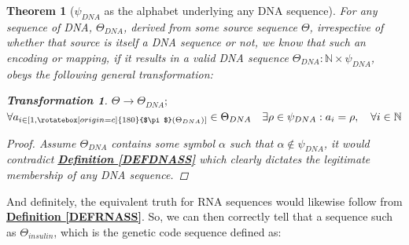 \documentclass[a4paper, 18pt]{book} %
\newtheorem{theo}{Theorem}
\newtheorem{trans}{Transformation}
\newcommand{\invpi}{\rotatebox[origin=c]{180}{$\pi$}}
\begin{document}
\begin{theo}[$\psi_{DNA}$ as the alphabet underlying any DNA sequence]
\label{THEODNA}
For any sequence of DNA, $\Theta_{DNA}$, derived from some source sequence $\Theta$, irrespective of whether that source is itself a DNA sequence or not, we know that such an encoding or mapping, if it results in a valid DNA sequence $\Theta_{DNA}: \mathbb{N} \times \psi_{DNA}$, obeys the following general transformation:\\

\begin{trans}
\label{TRANSmDNA}
$\Theta \rightarrow \Theta_{DNA};$\\
$\forall a_{i \in [1,\invpi(\Theta_{DNA})]} \in \Theta_{DNA} \quad \exists \rho \in \psi_{DNA}: a_i = \rho, \quad \forall i \in \mathbb{N}$
\end{trans}

\begin{proof}
    Assume $\Theta_{DNA}$ contains some symbol $\alpha$ such that $\alpha \not\in \psi_{DNA}$, it would contradict \textbf{\hyperref[DEFDNASS]{Definition \ref{DEFDNASS}}} which clearly dictates the legitimate membership of any DNA sequence.
\end{proof}

\end{theo}

\vspace{2em}


And definitely, the equivalent truth for RNA sequences would likewise follow from \textbf{\hyperref[DEFRNASS]{Definition \ref{DEFRNASS}}}. So, we can then correctly tell that a sequence such as $\Theta_{insulin}$, which is the genetic code sequence defined as:\\


\end{document}
